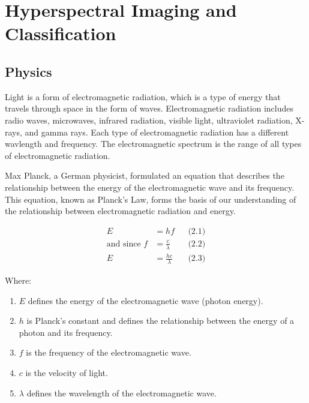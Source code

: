 \documentclass{article}
\begin{document}
{            \newpage
        \section{Hyperspectral Imaging and Classification}
            \setcounter{figure}{0}
            \subsection{Physics}
                \hspace{0.5cm}Light is a form of electromagnetic radiation, which is a type of energy that travels through space in the form of waves. Electromagnetic radiation includes radio waves, microwaves, infrared radiation, visible light, ultraviolet radiation, X-rays, and gamma rays. Each type of electromagnetic radiation has a different wavlength and frequency. The electromagnetic spectrum is the range of all types of electromagnetic radiation.\par
                Max Planck, a German physicist, formulated an equation that describes the relationship between the energy of the electromagnetic wave and its frequency. This equation, known as Planck’s Law, forms the basis of our understanding of the relationship between electromagnetic radiation and energy.\par
                \begin{align*}
                    E &= hf && \text{(2.1)} \\
                    \text{and since } f &= \frac{c}{\lambda} && \text{(2.2)} \\
                    E &= \frac{hc}{\lambda} && \text{(2.3)}
                \end{align*}
                
                \noindent
                \hspace{0.5em}Where:
                \begin{enumerate}
                    \setlength\itemindent{1.5em}
                    \setlength\leftskip{0.5em}
                    \item $E$ defines the energy of the electromagnetic wave (photon energy).
                    \item $h$ is Planck's constant and defines the relationship between the energy of a photon and its frequency.
                    \item $f$ is the frequency of the electromagnetic wave.
                    \item $c$ is the velocity of light.
                    \item $\lambda$ defines the wavelength of the electromagnetic wave.
                \end{enumerate}
                
}
\end{document}
